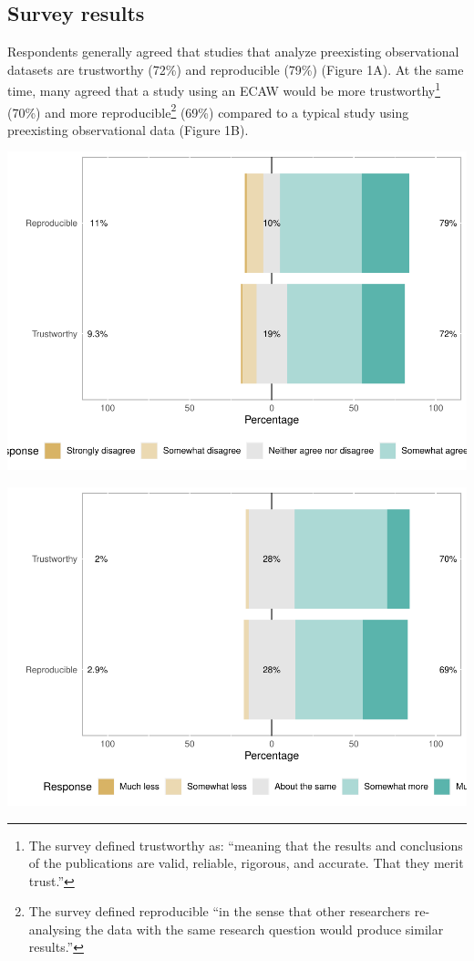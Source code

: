 \documentclass[
  man]{apa6}
\begin{document}
\hypertarget{survey-results}{%
\subsection{Survey results}\label{survey-results}}

Respondents generally agreed that studies that analyze preexisting observational datasets are trustworthy (72\%) and reproducible (79\%) (Figure 1A). At the same time, many agreed that a study using an ECAW would be more trustworthy\footnote{The survey defined trustworthy as: ``meaning that the results and conclusions of the publications are valid, reliable, rigorous, and accurate. That they merit trust.''} (70\%) and more reproducible\footnote{The survey defined reproducible ``in the sense that other researchers re-analysing the data with the same research question would produce similar results.''} (69\%) compared to a typical study using preexisting observational data (Figure 1B).

\includegraphics{manuscript_files/figure-latex/unnamed-chunk-6-1.pdf}

\includegraphics{manuscript_files/figure-latex/unnamed-chunk-7-1.pdf}
\end{document}
